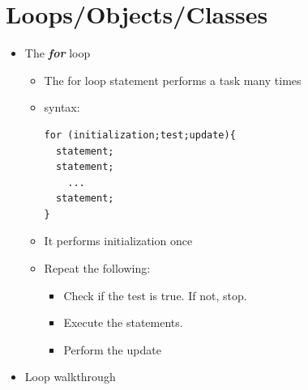 \documentclass[a4paper]{article}
\begin{document}
\section{Loops/Objects/Classes}
    \begin{itemize}
      \item The \textit{\textbf{for}} loop
        \begin{itemize}
          \item The for loop statement performs a task many times
          \item syntax:
            \begin{lstlisting}
for (initialization;test;update){
  statement;
  statement;
    ...
  statement;
}
            \end{lstlisting}
            \item It performs initialization once
            \item Repeat the following:
              \begin{itemize}
                \item Check if the test is true. If not, stop.
                \item Execute the statements.
                \item Perform the update
              \end{itemize}
        \end{itemize}
      \item Loop walkthrough  


\end{itemize}
\end{document}
